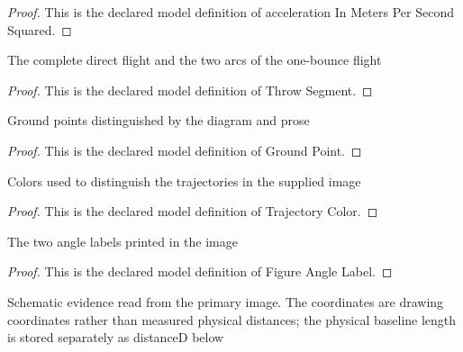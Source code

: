 \begin{proof}
  This is the declared model definition of acceleration In Meters Per Second Squared.
\end{proof}
\begin{definition}
  \label{def:physics:phyx-mini-0693:phyxminiproblems-problemphyxmini0693-throwsegment}
  The complete direct flight and the two arcs of the one-bounce flight
\end{definition}
\begin{proof}
  This is the declared model definition of Throw Segment.
\end{proof}
\begin{definition}
  \label{def:physics:phyx-mini-0693:phyxminiproblems-problemphyxmini0693-groundpoint}
  Ground points distinguished by the diagram and prose
\end{definition}
\begin{proof}
  This is the declared model definition of Ground Point.
\end{proof}
\begin{definition}
  \label{def:physics:phyx-mini-0693:phyxminiproblems-problemphyxmini0693-trajectorycolor}
  Colors used to distinguish the trajectories in the supplied image
\end{definition}
\begin{proof}
  This is the declared model definition of Trajectory Color.
\end{proof}
\begin{definition}
  \label{def:physics:phyx-mini-0693:phyxminiproblems-problemphyxmini0693-figureanglelabel}
  The two angle labels printed in the image
\end{definition}
\begin{proof}
  This is the declared model definition of Figure Angle Label.
\end{proof}
\begin{definition}
  \label{def:physics:phyx-mini-0693:phyxminiproblems-problemphyxmini0693-baseballthrowfigure}
  Schematic evidence read from the primary image. The coordinates are drawing coordinates rather than measured physical distances; the physical baseline length is stored separately as distanceD below
\end{definition}
